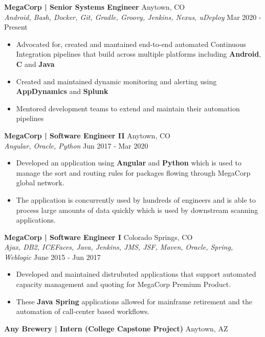 \documentclass[a4paper]{article}
\begin{document}
\textbf{MegaCorp | Senior Systems Engineer} \hfill Anytown, CO\\
\textsl{Android, Bash, Docker, Git, Gradle, Groovy, Jenkins, Nexus, uDeploy} \hfill Mar 2020 - Present\\
\vspace{-1mm}
\begin{itemize} \itemsep 1pt
	\item 	Advocated for, created and mantained end-to-end automated Continuous Integration pipelines that build across multiple platforms including \textbf{Android}, \textbf{C} and \textbf{Java}
	\item  Created and maintained dynamic monitoring and alerting using \textbf{AppDynamics} and \textbf{Splunk} 
	\item  Mentored development teams to extend and maintain their automation pipelines
\end{itemize}
\textbf{MegaCorp | Software Engineer II} \hfill Anytown, CO\\
\textsl{Angular, Oracle, Python} \hfill Jun 2017 - Mar 2020\\
\vspace{-1mm}
\begin{itemize} \itemsep 1pt
	\item  Developed an application using \textbf{Angular} and \textbf{Python} which is used to manage the sort and routing rules for packages flowing through MegaCorp global network. 
	\item  The application is concurrently used by hundreds of engineers and is able to process large amounts of data quickly which is used by downstream scanning applications.
\end{itemize}
\textbf{MegaCorp | Software Engineer I} \hfill Colorado Springs, CO\\
\textsl{Ajax, DB2, ICEFaces, Java, Jenkins, JMS, JSF, Maven, Oracle, Spring, Weblogic} \hfill June 2015 - Jun 2017\\
\vspace{-1mm}
\begin{itemize} \itemsep 1pt
	\item  Developed and maintained distrubuted applications that support automated capacity management and quoting for MegaCorp Premium Product. 
	\item These \textbf{Java Spring} applications allowed for mainframe retirement and the automation of call-center based workflows. 
\end{itemize}
\textbf{Any Brewery | Intern (College Capstone Project)} \hfill Anytown, AZ\\
\end{document}
